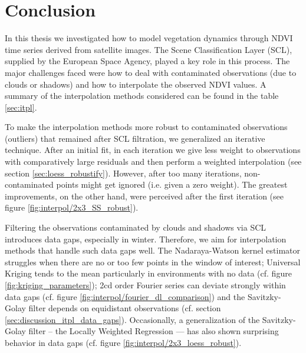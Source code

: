 \chapter{Conclusion}
\label{sec:Conclusion}


    In this thesis we investigated how to model vegetation dynamics through NDVI time series derived from satellite images. The Scene Classification Layer (SCL), supplied by the European Space Agency, played a key role in this process. The major challenges faced were how to deal with contaminated observations (due to clouds or shadows) and how to interpolate the observed NDVI values. 
    A summary of the interpolation methods considered can be found in the table \ref{sec:itpl}. 
    
    To make the interpolation methods more robust to contaminated observations (outliers) that remained after SCL filtration, we generalized an iterative technique. After an initial fit, in each iteration we give less weight to observations with comparatively large residuals and then perform a weighted interpolation (see section \ref{sec:loess_robustify}). However, after too many iterations, non-contaminated points might get ignored (i.e. given a zero weight). The greatest improvements, on the other hand, were perceived after the first iteration (see figure \ref{fig:interpol/2x3_SS_robust}). 
    
    Filtering the observations contaminated by clouds and shadows via SCL introduces data gaps, especially in winter. Therefore, we aim for interpolation methods that handle such data gaps well. The Nadaraya-Watson kernel estimator struggles when there are no or too few points in the window of interest; Universal Kriging tends to the mean particularly in environments with no data (cf. figure \ref{fig:kriging_parameters}); 2cd order Fourier series can deviate strongly within data gaps (cf. figure \ref{fig:interpol/fourier_dl_comparison}) and the Savitzky-Golay filter depends on equidistant observations (cf. section \ref{sec:discussion_itpl_data_gaps}). Occasionally, a generalization of the Savitzky-Golay filter -- the Locally Weighted Regression --- has also shown surprising behavior in data gaps (cf. figure \ref{fig:interpol/2x3_loess_robust}).
    
